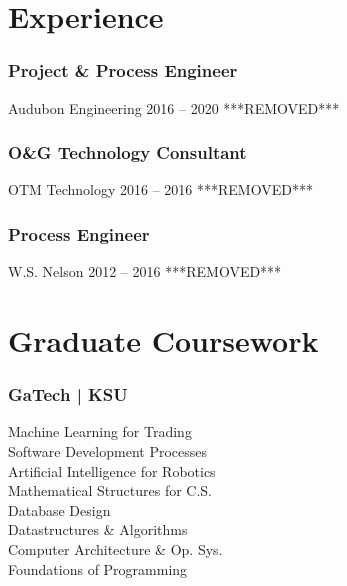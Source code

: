 \section{Experience}
  \position
    {\subsubsection{Project \& Process Engineer}}
    {Audubon Engineering}
    {2016 -- 2020}
    {***REMOVED***}%
  \position
    {\subsubsection{O\&G Technology Consultant}}
    {OTM Technology}
    {2016 -- 2016}
    {***REMOVED***}%
  \position
    {\subsubsection{Process Engineer}}
    {W.S. Nelson}
    {2012 -- 2016}
    {***REMOVED***}%
\section{Graduate Coursework}
  \subsubsection{GaTech | KSU}
      Machine Learning for Trading\\
      Software Development Processes\\
      Artificial Intelligence for Robotics\\
      Mathematical Structures for C.S.\\
      Database Design\\
      Datastructures \& Algorithms\\
      Computer Architecture \& Op. Sys.\\
      Foundations of Programming\\
